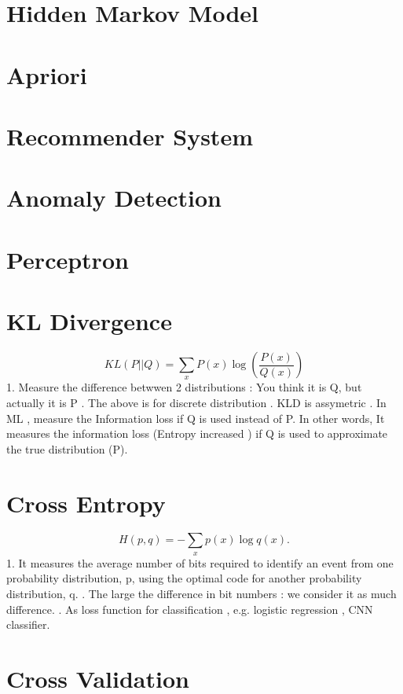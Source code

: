 \documentclass{article}
\begin{document}
\section{Hidden Markov Model}
\section{Apriori}
\section{Recommender System}
\section{Anomaly Detection} 
\section{Perceptron}
\section{KL Divergence } 
\[KL(P||Q)=\sum_{x}P(x)\log(\frac{P(x)}{Q(x)})\] 
1. Measure the difference betwwen 2 distributions : You think it is Q, but actually it is P  . The above is for discrete distribution . KLD is assymetric . In ML , measure the Information loss if Q is used instead of P. In other words, It measures the information loss (Entropy increased ) if Q is used to approximate the true distribution (P).  
\section{Cross Entropy}
\[H(p,q)=-\sum_x p(x)\log q(x).\]
1. It measures the average number of bits required to identify an event from one probability distribution, p, using the optimal code for another probability distribution, q. . The large the difference in bit numbers : we consider it as much difference. . As loss function for classification , e.g. logistic regression , CNN classifier. \newline
\section{Cross Validation}
\end{document}

